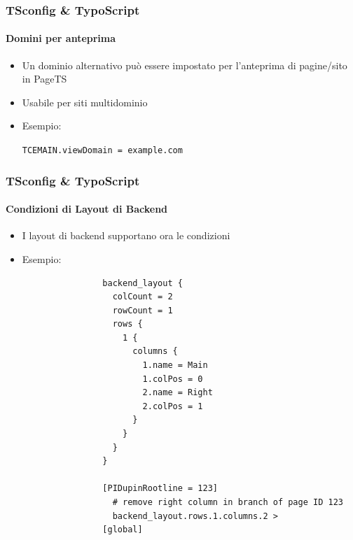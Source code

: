 
\begin{frame}[fragile]
	\frametitle{TSconfig \& TypoScript}
	\framesubtitle{Domini per anteprima}

	\begin{itemize}

		\item Un dominio alternativo può essere impostato per l'anteprima di pagine/sito in PageTS
		\item Usabile per siti multidominio
		\item Esempio:

			\lstinline!TCEMAIN.viewDomain = example.com!

	\end{itemize}

\end{frame}


\begin{frame}[fragile]
	\frametitle{TSconfig \& TypoScript}
	\framesubtitle{Condizioni di Layout di Backend}

	\begin{itemize}

		\item I layout di backend supportano ora le condizioni
		\item Esempio:

			\lstset{
				basicstyle=\tiny\ttfamily
			}

			\begin{lstlisting}
				backend_layout {
				  colCount = 2
				  rowCount = 1
				  rows {
				    1 {
				      columns {
				        1.name = Main
				        1.colPos = 0
				        2.name = Right
				        2.colPos = 1
				      }
				    }
				  }
				}

				[PIDupinRootline = 123]
				  # remove right column in branch of page ID 123
				  backend_layout.rows.1.columns.2 >
				[global]
			\end{lstlisting}

	\end{itemize}

\end{frame}

